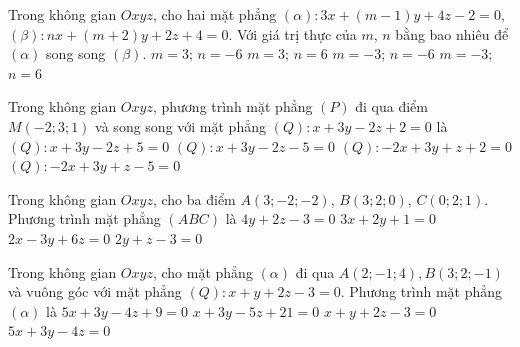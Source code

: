 \begin{ex}%
Trong không gian $Oxyz$, cho hai mặt phẳng $(\alpha)\colon  3 x+(m-1) y+4 z-2=0$, $ (\beta)\colon  n x+(m+2) y+2 z+4=0$. Với giá trị thực của $m$, $n$ bằng bao nhiêu để $(\alpha)$ song song $(\beta)$.
\choice
{$m=3$; $n=-6$}
{$m=3$; $n=6$}
{$m=-3$; $n=-6$}
{\True $m=-3$; $n=6$}
\end{ex}

\begin{ex}%
Trong không gian $O x y z$, phương trình mặt phẳng $(P)$ đi qua điểm $M(-2 ; 3 ; 1)$ và song song với mặt phẳng $(Q)\colon  x+3 y-2 z+2=0$ là
\choice
{$(Q)\colon  x+3 y-2 z+5=0$}
{\True $(Q)\colon  x+3 y-2 z-5=0$}
{$(Q)\colon  -2x+3 y+z+2=0$}
{$(Q)\colon  -2x+3 y+z-5=0$}
\end{ex}

\begin{ex}%
Trong không gian $Oxyz$, cho ba điểm $A(3 ;-2 ;-2)$, $B(3 ; 2 ; 0)$, $C(0 ; 2 ; 1)$. Phương trình mặt phẳng $(A B C)$ là
\choice
{$4 y+2 z-3=0$}
{$3 x+2 y+1=0$}
{\True $2 x-3 y+6 z=0$}
{$2 y+z-3=0$}
\end{ex}

\begin{ex}%
Trong không gian $Oxyz$, cho mặt phẳng $(\alpha)$ đi qua $A(2 ;-1 ; 4), B(3 ; 2 ;-1)$ và vuông góc với mặt phẳng $(Q)\colon  x+y+2 z-3=0$. Phương trình mặt phẳng $(\alpha)$ là
\choice
{\True $5x+3y-4z+9=0$}
{$x+3y-5z+21=0$}
{$x+y+2z-3=0$}
{$5x+3y-4z=0$}
\end{ex}

